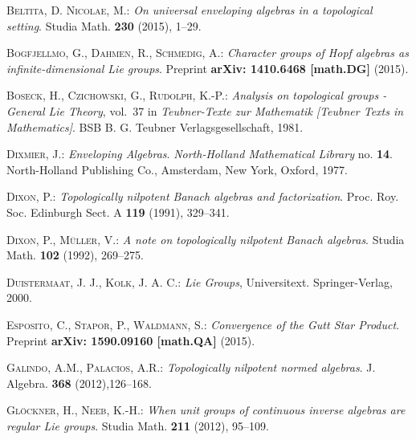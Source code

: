 \documentclass[
11pt,                          %
english                        %
]{article}
\begin{document}
\begin{thebibliography}{1}

\footnotesize
{}
\textsc{Beltita, D. Nicolae, M.: }\newblock \emph{On universal enveloping algebras in 
  a topological setting}.
\newblock Studia Math. \textbf{230} (2015), 1--29.

\textsc{Bogfjellmo, G., Dahmen, R., Schmedig, A.: }\newblock \emph{Character
  groups of Hopf algebras as infinite-dimensional Lie groups}.
\newblock Preprint  \textbf{arXiv: 1410.6468 [math.DG]} (2015).

\textsc{Boseck, H., Czichowski, G., Rudolph, K.-P.: }\newblock \emph{Analysis
  on topological groups - General Lie Theory}, vol.~37 in \emph{Teubner-Texte
  zur Mathematik [Teubner Texts in Mathematics]}.
\newblock BSB B. G. Teubner Verlagsgesellschaft, 1981.

\textsc{Dixmier, J.: }\newblock \emph{Enveloping Algebras}.
\newblock \emph{North-Holland Mathematical Library} no. \textbf{14}.
\newblock North-Holland Publishing Co., Amsterdam, New York, Oxford, 1977.

\textsc{Dixon, P.: }\newblock \emph{Topologically nilpotent Banach algebras and 
factorization}.
\newblock Proc. Roy. Soc. Edinburgh Sect. A \textbf{119} (1991), 329--341.

\textsc{Dixon, P., M\"uller, V.: }\newblock \emph{A note on topologically 
nilpotent Banach algebras}.
\newblock Studia Math. \textbf{102} (1992), 269--275.

\textsc{Duistermaat, J. J., Kolk, J. A. C.: }\newblock \emph{Lie Groups},
Universitext.
\newblock Springer-Verlag, 2000.

\textsc{Esposito, C., Stapor, P., Waldmann, S.: }\newblock \emph{Convergence 
  of the Gutt Star Product}.
\newblock Preprint  \textbf{arXiv: 1590.09160 [math.QA]} (2015).

\textsc{Galindo, A.M., Palacios, A.R.: }\newblock \emph{Topologically nilpotent 
normed algebras}.
\newblock J. Algebra.  \textbf{368} (2012),126--168.

\textsc{Gl{\"o}ckner, H., Neeb, K.-H.: }\newblock \emph{When unit groups of
  continuous inverse algebras are regular Lie groups}.
\newblock Studia Math.  \textbf{211} (2012), 95--109.


\end{thebibliography}
\end{document}
